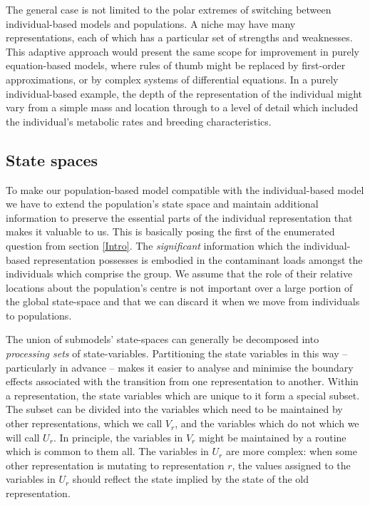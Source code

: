 The general case is not limited to the polar extremes of switching between
individual-based models and populations. A niche may have many
representations, each of which has a particular set of strengths and
weaknesses. This adaptive approach would present the same scope for
improvement in purely equation-based models, where rules of thumb might be
replaced by first-order approximations, or by complex systems of differential
equations. In a purely individual-based example, the depth of the
representation of the individual might vary from a simple mass and location
through to a level of detail which included the individual's metabolic rates
and breeding characteristics.

\subsection{State spaces}

To make our population-based model compatible with the individual-based model
we have to extend the population's state space and maintain additional
information to preserve the essential parts of the individual representation
that makes it valuable to us. This is basically posing the first of the
enumerated question from section \ref{Intro}. The {\em{significant}}
information which the individual-based representation possesses is embodied in
the contaminant loads amongst the individuals which comprise the group. We
assume that the role of their relative locations about the population's centre
is not important over a large portion of the global state-space and that we
can discard it when we move from individuals to populations.

The union of submodels' state-spaces can generally be decomposed into
{\em{processing sets}} of state-variables. Partitioning the state variables
in this way -- particularly in advance -- makes it easier to analyse and
minimise the boundary effects associated with the transition from one
representation to another. Within a representation, the state variables which
are unique to it form a special subset. The subset can be divided into the
variables which need to be maintained by other representations, which we call
$V_r^{}$, and the variables which do not which we will call $U_r^{}$. In
principle, the variables in $V_r$ might be maintained by a routine which is
common to them all. The variables in $U_r$ are more complex: when some other
representation is mutating to representation $r$, the values assigned to the
variables in $U_r$ should reflect the state implied by the state of the old
representation.

